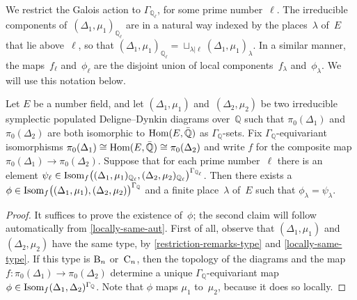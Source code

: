 \documentclass[10pt,twoside,leqno]{article}
\numberwithin{equation}{subsection}
\newcommand{\Hom}{\textnormal{Hom}}
\newcommand{\Isom}{\textnormal{Isom}}
\newcommand{\QQ}{\mathbb{Q}}
\newcommand{\QQbar}{\bar{\QQ}}
\newcommand{\QQl}{\QQ_{\ell}}
\newcommand{\DtB}{\textnormal{B}}
\newcommand{\DtC}{\textnormal{C}}
\begin{document}
We restrict the Galois action to $\Gamma_{\QQl}$,
for some prime number~$\ell$.
The irreducible components of~$(\Delta_1,\mu_1)_{\QQl}$
are in a natural way indexed by the places~$\lambda$ of~$E$
that lie above~$\ell$, so that
$(\Delta_1,\mu_1)_{\QQl} = \sqcup_{\lambda|\ell} (\Delta_1,\mu_1)_\lambda$.
In a similar manner, the maps~$f_\ell$ and~$\phi_\ell$
are the disjoint union of local components~$f_\lambda$ and~$\phi_\lambda$.
We will use this notation below.

\begin{proposition} %
 \label{deldyn-local-global}
 Let $E$ be a number field, and
 let $(\Delta_1,\mu_1)$ and~$(\Delta_2,\mu_2)$ be two
 irreducible symplectic populated Deligne--Dynkin diagrams over~$\QQ$
 such that $\pi_0(\Delta_1)$ and $\pi_0(\Delta_2)$ are
 both isomorphic to $\Hom(E,\QQbar)$ as $\Gamma_\QQ$-sets.
 Fix $\Gamma_\QQ$-equivariant isomorphisms
 $\pi_0(\Delta_1) \cong \Hom(E,\QQbar) \cong \pi_0(\Delta_2)$
 and write $f$ for the composite map $\pi_0(\Delta_1) \to \pi_0(\Delta_2)$.
 Suppose that for each prime number~$\ell$ there is an element
 $\psi_\ell \in
 \Isom_f\big((\Delta_1,\mu_1)_{\QQl},(\Delta_2,\mu_2)_{\QQl}\big)^{\Gamma_{\QQl}}$.
 Then there exists a
 $\phi \in \Isom_f\big((\Delta_1,\mu_1),(\Delta_2,\mu_2)\big)^{\Gamma_\QQ}$
 and a finite place~$\lambda$ of~$E$
 such that $\phi_\lambda = \psi_\lambda$.
 \begin{proof}
  It suffices to prove the existence of~$\phi$;
  the second claim will follow automatically from \cref{locally-same-aut}.
  First of all, observe
  that $(\Delta_1,\mu_1)$ and~$(\Delta_2,\mu_2)$ have the same type,
  by \cref{restriction-remarks-type} and \cref{locally-same-type}.
  If this type is $\DtB_n$ or~$\DtC_n$,
  then the topology of the diagrams
  and the map $f \colon \pi_0(\Delta_1) \to \pi_0(\Delta_2)$
  determine a unique $\Gamma_\QQ$-equivariant map
  $\phi \in \Isom_f(\Delta_1,\Delta_2)^{\Gamma_\QQ}$.
  Note that $\phi$ maps $\mu_1$ to~$\mu_2$,
  because it does so locally.


\end{proof}
\end{proposition}
\end{document}
